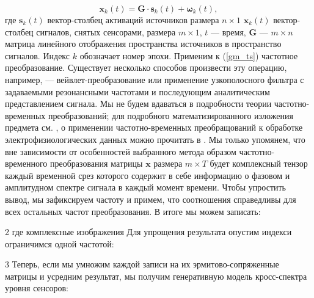 \begin{equation}
	\mathbf{x}_k(t) = \mathbf{G} \cdot \mathbf{s}_k(t) + \mathbf{\omega}_k(t),
	\label{gm_ts}
\end{equation}
где $\mathbf{s}_k(t)$  вектор-столбец активаций источников размера $n \times 1$
$\mathbf{x}_k(t)$ вектор-столбец сигналов, снятых сенсорами,
размера $m \times 1$, $t$ --- время, $\mathbf{G}$ --- $m \times n$ матрица линейного отображения пространства источников в пространство сигналов.
Индекс $k$ обозначает номер эпохи.
Применим к (\ref{gm_ts}) частотное преобразование. Существует несколько способов произвести
эту операцию, например, --- вейвлет-преобразование или применение узкополосного фильтра
с задаваемыми резонансными частотами и последующим аналитическим представлением сигнала.
Мы не будем вдаваться в подробности теории частотно-временных преобразований;
для подробного математизированного изложения предмета см.
\cite{Oppenheim1998}, о  применении  частотно-временных преобращований к обработке
электрофизиологических данных можно прочитать в \cite{Freeman}.
Мы только упомянем, что вне зависимости от особенностей выбранного
метода образом частотно-временного преобразования матрицы $\mathbf{x}$ размера $m \times T$
будет комплексный тензор каждый временной срез которого содержит в себе информацию
о фазовом и амплитудном спектре сигнала в каждый момент времени.
Чтобы упростить вывод, мы зафиксируем частоту и примем,
что соотношения справедливы для всех остальных частот преобразования. В итоге мы можем записать:

2
где комплексные изображения Для упрощения результата опустим индекси ограничимся одной частотой: 

3
Теперь, если мы умножим каждой записи на их эрмитово-сопряженные матрицы и усредним результат, мы получим генеративную модель кросс-спектра уровня сенсоров:

